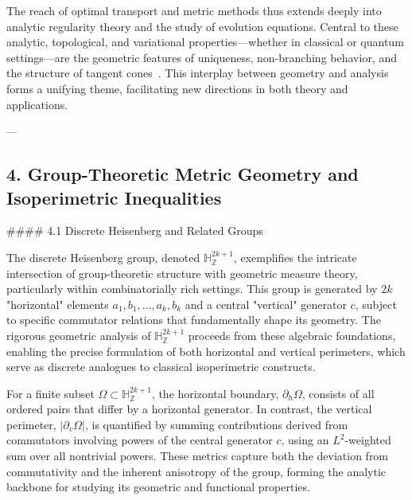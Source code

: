 \documentclass[11pt]{article}
\begin{document}
\vspace{1em}
\noindent
The reach of optimal transport and metric methods thus extends deeply into analytic regularity theory and the study of evolution equations. Central to these analytic, topological, and variational properties—whether in classical or quantum settings—are the geometric features of uniqueness, non-branching behavior, and the structure of tangent cones~\cite{ref96,ref97,ref107}. This interplay between geometry and analysis forms a unifying theme, facilitating new directions in both theory and applications.

---
\subsection{4. Group-Theoretic Metric Geometry and Isoperimetric Inequalities}

#### 4.1 Discrete Heisenberg and Related Groups

The discrete Heisenberg group, denoted $\mathbb{H}_{\mathbb{Z}}^{2k+1}$, exemplifies the intricate intersection of group-theoretic structure with geometric measure theory, particularly within combinatorially rich settings. This group is generated by $2k$ "horizontal" elements $a_1, b_1, \ldots, a_k, b_k$ and a central "vertical" generator $c$, subject to specific commutator relations that fundamentally shape its geometry. The rigorous geometric analysis of $\mathbb{H}_{\mathbb{Z}}^{2k+1}$ proceeds from these algebraic foundations, enabling the precise formulation of both horizontal and vertical perimeters, which serve as discrete analogues to classical isoperimetric constructs.

For a finite subset $\Omega \subset \mathbb{H}_{\mathbb{Z}}^{2k+1}$, the horizontal boundary, $\partial_{h}\Omega$, consists of all ordered pairs that differ by a horizontal generator. In contrast, the vertical perimeter, $|\partial_{v} \Omega|$, is quantified by summing contributions derived from commutators involving powers of the central generator $c$, using an $L^2$-weighted sum over all nontrivial powers. These metrics capture both the deviation from commutativity and the inherent anisotropy of the group, forming the analytic backbone for studying its geometric and functional properties.
\end{document}
